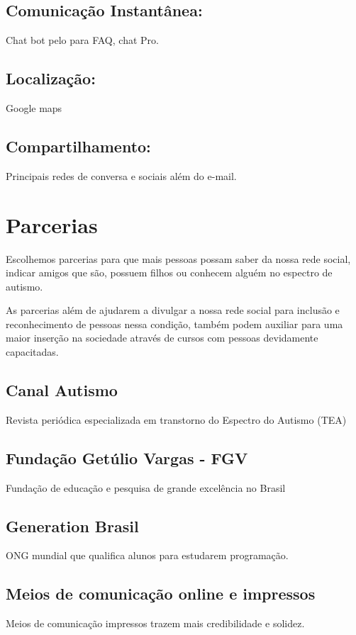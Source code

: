 \begin{apendicesenv}
\subsection{Comunicação Instantânea:}
Chat bot pelo para FAQ, chat Pro. 
\subsection{Localização:}
Google maps
\subsection{Compartilhamento:}
Principais redes de conversa e sociais além do e-mail. 

\section{Parcerias}
Escolhemos parcerias para que mais pessoas possam saber da nossa rede social, indicar amigos que são, possuem filhos ou conhecem alguém no espectro de autismo.

As parcerias além de ajudarem a divulgar a nossa rede social para inclusão e reconhecimento de pessoas nessa condição, também podem auxiliar para uma maior inserção na sociedade através de cursos com pessoas devidamente capacitadas.

\subsection{Canal Autismo}
Revista periódica especializada em transtorno do Espectro do Autismo (TEA)

\subsection{Fundação Getúlio Vargas - FGV}
Fundação de educação e pesquisa de grande excelência no Brasil

\subsection{Generation Brasil}
ONG mundial que qualifica alunos para estudarem programação.

\subsection{Meios de comunicação online e impressos}
Meios de comunicação impressos trazem mais credibilidade e solidez.


\end{apendicesenv}
